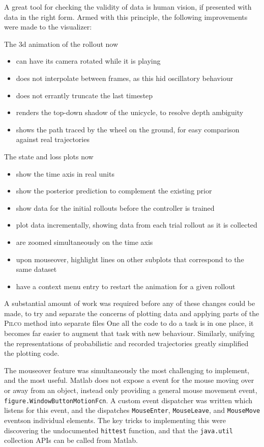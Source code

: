\documentclass[main.tex]{subfiles}
\begin{document}
A great tool for checking the validity of data is human vision, if presented with data in the right form.
Armed with this principle, the following improvements were made to the visualizer:
\begin{multicols}{2}
	\raggedcolumns
	\noindent
	The 3d animation of the rollout now
	\begin{itemize}[nosep]
		\item can have its camera rotated while it is playing
		\item does not interpolate between frames, as this hid oscillatory behaviour
		\item does not errantly truncate the last timestep
		\item renders the top-down shadow of the unicycle, to resolve depth ambiguity
		\item shows the path traced by the wheel on the ground, for easy comparison against real trajectories
	\end{itemize}
	\columnbreak
	\noindent
	The state and loss plots now
	\begin{itemize}[nosep]
		\item show the time axis in real units
		\item show the posterior prediction to complement the existing prior
		\item show data for the initial rollouts before the controller is trained
		\item plot data incrementally, showing data from each trial rollout as it is collected
		\item are zoomed simultaneously on the time axis
		\item upon mouseover, highlight lines on other subplots that correspond to the same dataset
		\item have a context menu entry to restart the animation for a given rollout
	\end{itemize}
\end{multicols}

A substantial amount of work was required before any of these changes could be made, to try and separate the concerns of plotting data and applying parts of the \textsc{Pilco} method into separate files
One all the code to do a task is in one place, it becomes far easier to augment that task with new behaviour.
Similarly, unifying the representations of probabilistic and recorded trajectories greatly simplified the plotting code.

The mouseover feature was simultaneously the most challenging to implement, and the most useful.
Matlab does not expose a event for the mouse moving over or away from an object, instead only providing a general mouse movement event, \texttt{figure.WindowButtonMotionFcn}.
A custom event dispatcher was written which listens for this event, and the dispatches \texttt{MouseEnter}, \texttt{MouseLeave}, and \texttt{MouseMove} events\footnotemark on individual elements.
The key tricks to implementing this were discovering the undocumented \texttt{hittest} function\cite{matlab-hittest}, and that the \texttt{java.util} collection APIs can be called from Matlab.
\end{document}
